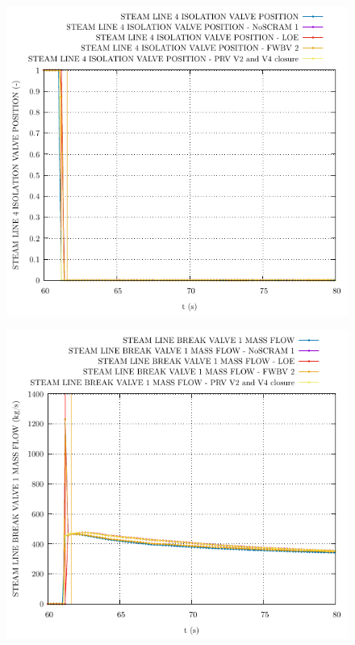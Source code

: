 \documentclass{article}
\begin{document}
\begin{multicols}{2}
\begin{figure}[H]
\centering
\includegraphics[width=\linewidth]{./graphs/STEAM LINE 4 ISOLATION VALVE POSITION.pdf}
\end{figure}
\begin{figure}[H]
\centering
\includegraphics[width=\linewidth]{./graphs/STEAM LINE BREAK VALVE 1 MASS FLOW.pdf}
\end{figure}
\begin{figure}[H]

\end{figure}
\end{multicols}
\end{document}
